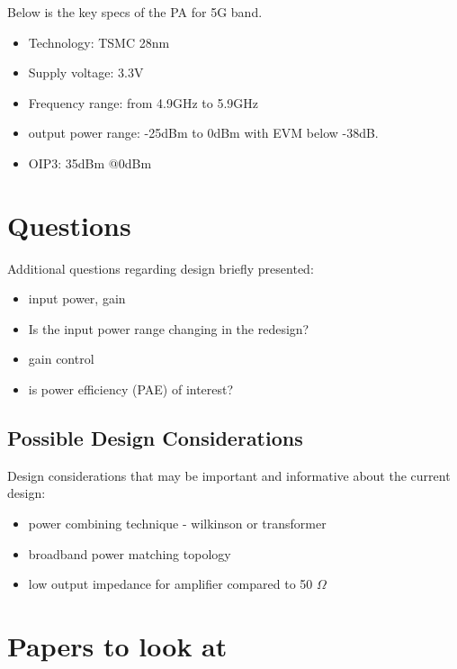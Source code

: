 \documentclass{article}
\begin{document}
Below is the key specs of the PA for 5G band. 

\begin{itemize}
	\item Technology: TSMC 28nm 
	\item Supply voltage: 3.3V 
	\item Frequency range: from 4.9GHz to 5.9GHz 
	\item output power range: -25dBm to 0dBm with EVM below -38dB. 
	\item OIP3: 35dBm @0dBm %
\end{itemize}


\section{Questions}

Additional questions regarding design briefly presented:

\begin{itemize}
	\item input power, gain %
	\item Is the input power range changing in the redesign? 
	\item gain control %
	\item is power efficiency (PAE) of interest?
\end{itemize}

\subsection{Possible Design Considerations}

Design considerations that may be important and informative about the current design:

\begin{itemize}
	\item power combining technique - wilkinson or transformer %
	\item broadband power matching topology %
	\item low output impedance for amplifier compared to 50 $\Omega$
\end{itemize}

\section{Papers to look at}
\end{document}
